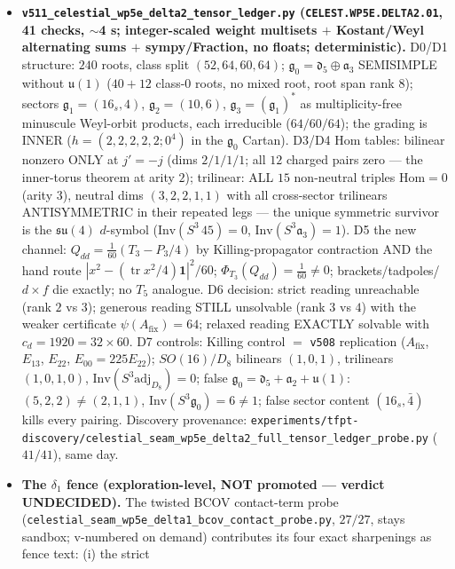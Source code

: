 \begin{itemize}[leftmargin=1.5em]
\item \textbf{\texttt{v511\_celestial\_wp5e\_delta2\_tensor\_ledger.py} (\texttt{CELEST.WP5E.DELTA2.01},
41 checks, $\sim$4 s; integer-scaled weight multisets $+$ Kostant/Weyl alternating sums $+$
sympy/Fraction, no floats; deterministic).} D0/D1 structure: $240$ roots, class split
$(52,64,60,64)$; $\mathfrak g_0=\mathfrak d_5\oplus\mathfrak a_3$ SEMISIMPLE without
$\mathfrak u(1)$ ($40{+}12$ class-$0$ roots, no mixed root, root span rank $8$); sectors
$\mathfrak g_1=(16_s,4)$, $\mathfrak g_2=(10,6)$, $\mathfrak g_3=(\mathfrak g_1)^*$ as
multiplicity-free minuscule Weyl-orbit products, each irreducible ($64/60/64$); the grading is
INNER ($h=(2,2,2,2,2;0^4)$ in the $\mathfrak g_0$ Cartan). D3/D4 Hom tables: bilinear nonzero
ONLY at $j'=-j$ (dims $2/1/1/1$; all $12$ charged pairs zero --- the inner-torus theorem at
arity $2$); trilinear: ALL $15$ non-neutral triples $\mathrm{Hom}=0$ (arity $3$), neutral dims
$(3,2,2,1,1)$ with all cross-sector trilinears ANTISYMMETRIC in their repeated legs --- the
unique symmetric survivor is the $\mathfrak{su}(4)$ $d$-symbol ($\mathrm{Inv}(S^3\,45)=0$,
$\mathrm{Inv}(S^3\mathfrak a_3)=1$). D5 the new channel: $Q_{dd}=\tfrac1{60}(T_3-P_3/4)$ by
Killing-propagator contraction AND the hand route $|x^2-(\operatorname{tr}x^2/4)\mathbf 1|^2/60$;
$\Phi_{T_3}(Q_{dd})=\tfrac1{60}\neq0$; brackets/tadpoles/$d{\times}f$ die exactly; no $T_5$
analogue. D6 decision: strict reading unreachable (rank $2$ vs $3$); generous reading STILL
unsolvable (rank $3$ vs $4$) with the weaker certificate $\psi(A_{\mathrm{fix}})=64$; relaxed
reading EXACTLY solvable with $c_d=1920=32\times60$. D7 controls: Killing control $=$
\texttt{v508} replication ($A_{\mathrm{fix}}$, $E_{13}$, $E_{22}$, $E_{00}=225E_{22}$);
$SO(16)/D_8$ bilinears $(1,0,1)$, trilinears $(1,0,1,0)$, $\mathrm{Inv}(S^3\mathrm{adj}_{D_8})=0$;
false $\mathfrak g_0=\mathfrak d_5{+}\mathfrak a_2{+}\mathfrak u(1)$: $(5,2,2)\neq(2,1,1)$,
$\mathrm{Inv}(S^3\mathfrak g_0)=6\neq1$; false sector content $(16_s,\bar4)$ kills every pairing.
Discovery provenance:
\texttt{experiments/tfpt-discovery/celestial\_seam\_wp5e\_delta2\_full\_tensor\_ledger\_probe.py}
($41/41$), same day.
\item \textbf{The $\delta_1$ fence (exploration-level, NOT promoted --- verdict UNDECIDED).} The
twisted BCOV contact-term probe
(\texttt{celestial\_seam\_wp5e\_delta1\_bcov\_contact\_probe.py}, $27/27$, stays sandbox;
v-numbered on demand) contributes its four exact sharpenings as fence text: (i) the strict

\end{itemize}
